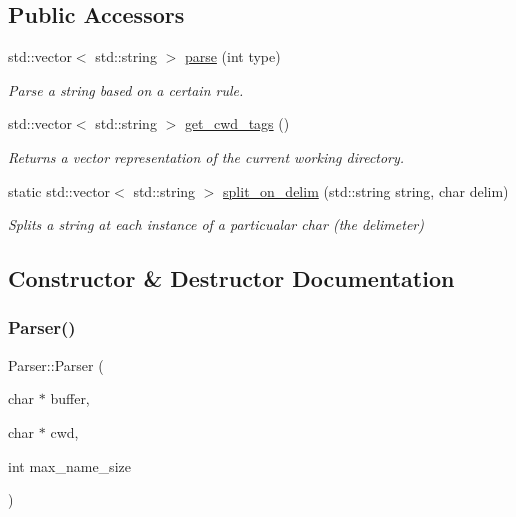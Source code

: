 \subsection*{Public Accessors}
\begin{DoxyCompactItemize}
\item 
std\+::vector$<$ std\+::string $>$ \mbox{\hyperlink{class_parser_a5b531e9ed867eeb8ccb9cb088cf35c24}{parse}} (int type)
\begin{DoxyCompactList}\small\item\em Parse a string based on a certain rule. \end{DoxyCompactList}\item 
std\+::vector$<$ std\+::string $>$ \mbox{\hyperlink{class_parser_aa973764b863dfbe448fa2fd7aa9ffdaa}{get\+\_\+cwd\+\_\+tags}} ()
\begin{DoxyCompactList}\small\item\em Returns a vector representation of the current working directory. \end{DoxyCompactList}\item 
static std\+::vector$<$ std\+::string $>$ \mbox{\hyperlink{class_parser_a71c87961db9707dc18db00a645d3d1e5}{split\+\_\+on\+\_\+delim}} (std\+::string string, char delim)
\begin{DoxyCompactList}\small\item\em Splits a string at each instance of a particualar char (the delimeter) \end{DoxyCompactList}\end{DoxyCompactItemize}


\subsection{Constructor \& Destructor Documentation}
\mbox{\label{class_parser_a306c6c33d7a6cf1bb682be360fcfe982}} 
\subsubsection{\texorpdfstring{Parser()}{Parser()}\hspace{0.1cm}{\footnotesize\ttfamily [1/4]}}
{\footnotesize\ttfamily Parser\+::\+Parser (\begin{DoxyParamCaption}\item[{char $\ast$}]{buffer,  }\item[{char $\ast$}]{cwd,  }\item[{int}]{max\+\_\+name\+\_\+size }\end{DoxyParamCaption})}

